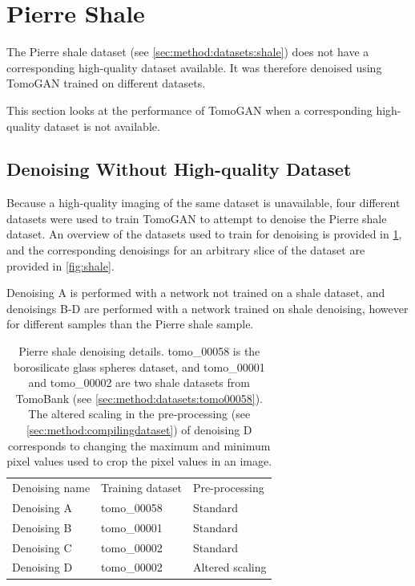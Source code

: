 \section{Pierre Shale}
The Pierre shale dataset (see \cref{sec:method:datasets:shale}) does not have a corresponding high-quality dataset available. It was therefore denoised using TomoGAN trained on different datasets. 

This section looks at the performance of TomoGAN when a corresponding high-quality dataset is not available. 

\subsection{Denoising Without High-quality Dataset}
Because a high-quality imaging of the same dataset is unavailable, four different datasets were used to train TomoGAN to attempt to denoise the Pierre shale dataset. An overview of the datasets used to train for denoising is provided in \cref{tab:pierreshaledenoisingdetails}, and the corresponding denoisings for an arbitrary slice of the dataset are provided in \cref{fig:shale}. 

Denoising A is performed with a network not trained on a shale dataset, and denoisings B-D are performed with a network trained on shale denoising, however for different samples than the Pierre shale sample. 

\begin{table}[htbp]
  \centering
  \caption[Pierre shale denoising details]{Pierre shale denoising details. tomo\_00058 is the borosilicate glass spheres dataset, and tomo\_00001 and tomo\_00002 are two shale datasets from TomoBank (see \cref{sec:method:datasets:tomo00058}). The altered scaling in the pre-processing (see \cref{sec:method:compilingdataset}) of denoising D corresponds to changing the maximum and minimum pixel values used to crop the pixel values in an image. }
  \label{tab:pierreshaledenoisingdetails}
  \begin{tabular}{lll}
  \hline
  Denoising name & Training dataset & Pre-processing\\
  \hhline{===}
  Denoising A & tomo\_00058 & Standard \\
  Denoising B & tomo\_00001 & Standard \\
  Denoising C & tomo\_00002 & Standard \\
  Denoising D & tomo\_00002 & Altered scaling \\
  \hline
  \end{tabular}
\end{table}


